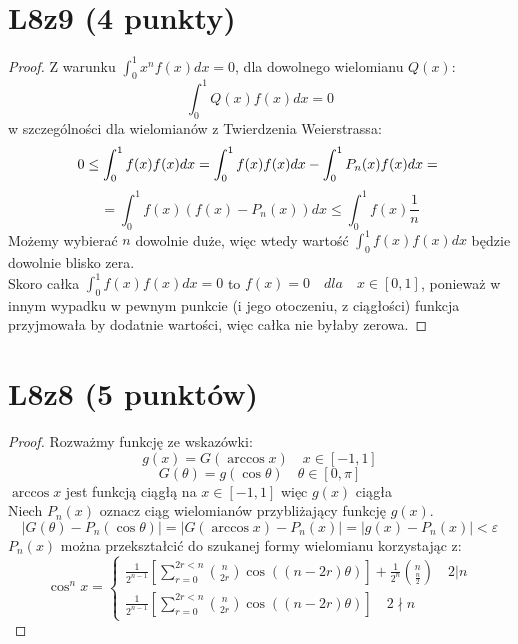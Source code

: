 \documentclass{article}
\title{}
\date{23.04.2020}
\author{Maurycy Borkowski}
\begin{document}
\maketitle

\section{L8z9 (4 punkty)}
\begin{proof}
Z warunku $\int_0^1 x^n f(x) dx = 0$, dla dowolnego wielomianu $Q(x)$:
$$\int_0^1 Q(x) f(x) dx = 0$$
w szczególności dla wielomianów z Twierdzenia Weierstrassa:
$$
0 \leq \int_0^1 f(x)f(x) dx = \int_0^1 f(x)f(x) dx - \int_0^1 P_n(x) f(x) dx = \\
$$
$$
= \int_0^1 f(x) \left (f(x) - P_n(x)\right)dx \leq \int_0^1 f(x) \frac{1}{n}
$$
Możemy wybierać $n$ dowolnie duże, więc wtedy wartość $\int_0^1 f(x)f(x) dx$ będzie dowolnie blisko zera.\\
Skoro całka $\int_0^1 f(x)f(x) dx = 0$ to $f(x) = 0 \quad dla \quad x \in [0,1]$, ponieważ w innym wypadku w pewnym punkcie (i jego otoczeniu, z ciągłości) funkcja przyjmowała by dodatnie wartości, więc całka nie byłaby zerowa.
\end{proof}
\section{L8z8 (5 punktów)}
\begin{proof}
Rozważmy funkcję ze wskazówki:
$$
g(x) = G(\arccos{x}) \quad x \in [-1,1]
$$
$$
G(\theta) = g(\cos \theta) \quad \theta \in [0,\pi]
$$
$\arccos x$ jest funkcją ciągłą na $x \in [-1,1]$ więc $g(x)$ ciągła\\
Niech $P_n(x)$ oznacz ciąg wielomianów przybliżający funkcję $g(x)$.
$$
|G(\theta) - P_n(\cos\theta)| = |G(\arccos{x}) - P_n(x)| = |g(x) - P_n(x)| < \varepsilon
$$
$P_n(x)$ można przekształcić do szukanej formy wielomianu korzystając z:
$$
{\cos^n x} = \begin{cases} \frac{1}{2^{n-1}} \left [ \sum_{r=0}^{2r<n} {n\choose2r} \cos {((n-2r)\theta)}  \right] + \frac{1}{2^n} {n\choose\frac{n}{2}}  \quad  2|n \\ \frac{1}{2^{n-1}} \left [ \sum_{r=0}^{2r<n} {n\choose2r} \cos {((n-2r)\theta)}  \right]\quad  2\nmid n
\end{cases}
$$
\end{proof}
\end{document}
